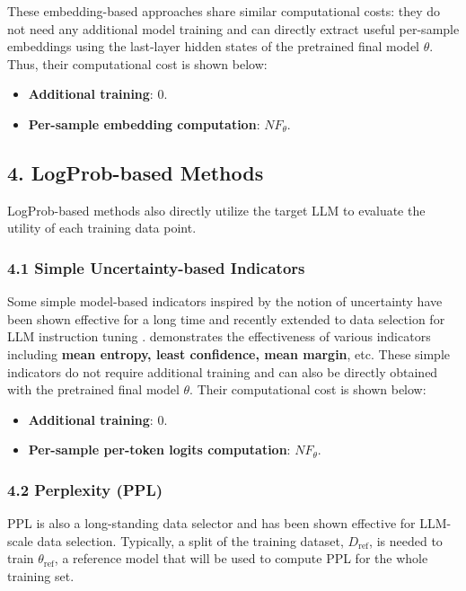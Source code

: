 These embedding-based approaches share similar computational costs: they do not need any additional model training and can directly extract useful per-sample embeddings using the last-layer hidden states of the pretrained final model $\theta$. Thus, their computational cost is shown below:

\begin{itemize}
    \item \textbf{Additional training}: 0.
    \item \textbf{Per-sample embedding computation}: $NF_{\theta}$.
\end{itemize}

\subsection*{4. LogProb-based Methods}

LogProb-based methods also directly utilize the target LLM to evaluate the utility of each training data point.

\subsubsection*{4.1 Simple Uncertainty-based Indicators}

Some simple model-based indicators inspired by the notion of uncertainty have been shown effective for a long time and recently extended to data selection for LLM instruction tuning \cite{Uncertainty1, Uncertainty2}. \cite{Uncertainty2} demonstrates the effectiveness of various indicators including \textbf{mean entropy, least confidence, mean margin}, etc. These simple indicators do not require additional training and can also be directly obtained with the pretrained final model $\theta$. Their computational cost is shown below:

\begin{itemize}
    \item \textbf{Additional training}: 0.
    \item \textbf{Per-sample per-token logits computation}: $NF_{\theta}$.
\end{itemize}

\subsubsection*{4.2 Perplexity (PPL)}

PPL is also a long-standing data selector and has been shown effective for LLM-scale data selection. Typically, a split of the training dataset, $D_{\text{ref}}$, is needed to train $\theta_{\text{ref}}$, a reference model that will be used to compute PPL for the whole training set.

